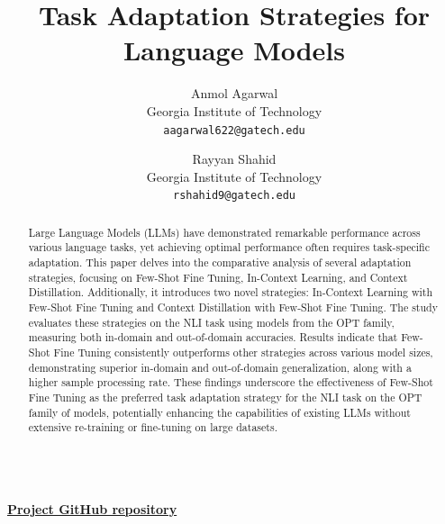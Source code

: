 \documentclass[10pt,twocolumn,letterpaper]{article}
\begin{document}
\title{Task Adaptation Strategies for Language Models}

\author{Anmol Agarwal\\
	Georgia Institute of Technology\\
	{\tt\small aagarwal622@gatech.edu}
	\and
	Rayyan Shahid\\
	Georgia Institute of Technology\\
	{\tt\small rshahid9@gatech.edu}
}

\maketitle




\begin{abstract}
	Large Language Models (LLMs) have demonstrated remarkable performance across various language tasks, yet achieving optimal performance often requires task-specific adaptation. This paper delves into the comparative analysis of several adaptation strategies, focusing on Few-Shot Fine Tuning, In-Context Learning, and Context Distillation. Additionally, it introduces two novel strategies: In-Context Learning with Few-Shot Fine Tuning and Context Distillation with Few-Shot Fine Tuning. The study evaluates these strategies on the NLI task using models from the OPT family, measuring both in-domain and out-of-domain accuracies. Results indicate that Few-Shot Fine Tuning consistently outperforms other strategies across various model sizes, demonstrating superior in-domain and out-of-domain generalization, along with a higher sample processing rate. These findings underscore the effectiveness of Few-Shot Fine Tuning as the preferred task adaptation strategy for the NLI task on the OPT family of models, potentially enhancing the capabilities of existing LLMs without extensive re-training or fine-tuning on large datasets.\\\\
\end{abstract}
\href{https://github.com/sicario001/llmft}{\textbf{Project GitHub repository}}
\end{document}
